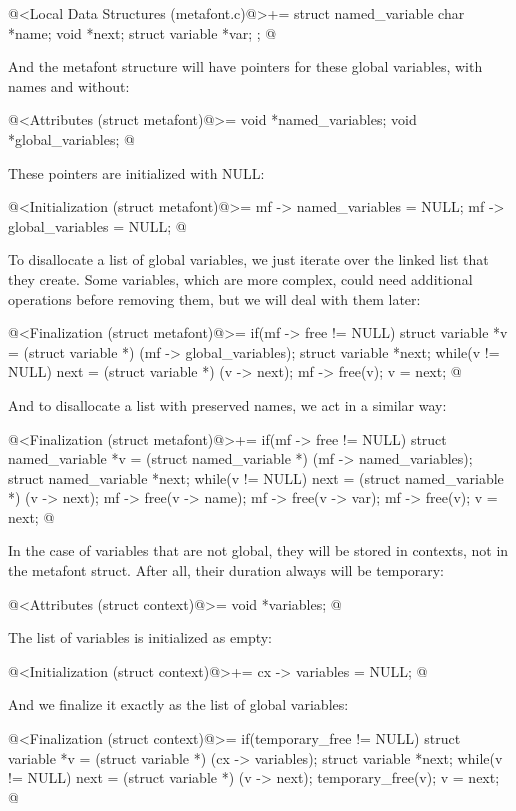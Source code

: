 \iniciocodigo
@<Local Data Structures (metafont.c)@>+=
struct named_variable{
  char *name;
  void *next;
  struct variable *var;
};
@
\fimcodigo

And the metafont structure will have pointers for these global
variables, with names and without:

\iniciocodigo
@<Attributes (struct metafont)@>=
  void *named_variables;
  void *global_variables;
@
\fimcodigo

These pointers are initialized with NULL:

\iniciocodigo
@<Initialization (struct metafont)@>=
mf -> named_variables = NULL;
mf -> global_variables = NULL;
@
\fimcodigo

To disallocate a list of global variables, we just iterate over the
linked list that they create. Some variables, which are more complex,
could need additional operations before removing them, but we will
deal with them later:

\iniciocodigo
@<Finalization (struct metafont)@>=
if(mf -> free != NULL){
  struct variable *v = (struct variable *) (mf -> global_variables);
  struct variable *next;
  while(v != NULL){
    next = (struct variable *) (v -> next);
    mf -> free(v);
    v = next;
  }
}
@
\fimcodigo

And to disallocate a list with preserved names, we act in a similar
way:

\iniciocodigo
@<Finalization (struct metafont)@>+=
if(mf -> free != NULL){
  struct named_variable *v = (struct named_variable *)
                                 (mf -> named_variables);
  struct named_variable *next;
  while(v != NULL){
    next = (struct named_variable *) (v -> next);
    mf -> free(v -> name);
    mf -> free(v -> var);
    mf -> free(v);
    v = next;
  }
}
@
\fimcodigo

In the case of variables that are not global, they will be stored in
contexts, not in the metafont struct. After all, their duration always
will be temporary:

\iniciocodigo
@<Attributes (struct context)@>=
  void *variables;
@
\fimcodigo

The list of variables is initialized as empty:

\iniciocodigo
@<Initialization (struct context)@>+=
cx -> variables = NULL;
@
\fimcodigo

And we finalize it exactly as the list of global variables:

\iniciocodigo
@<Finalization (struct context)@>=
if(temporary_free != NULL){
  struct variable *v = (struct variable *) (cx -> variables);
  struct variable *next;
  while(v != NULL){
    next = (struct variable *) (v -> next);
    temporary_free(v);
    v = next;
  }
}
@
\fimcodigo

